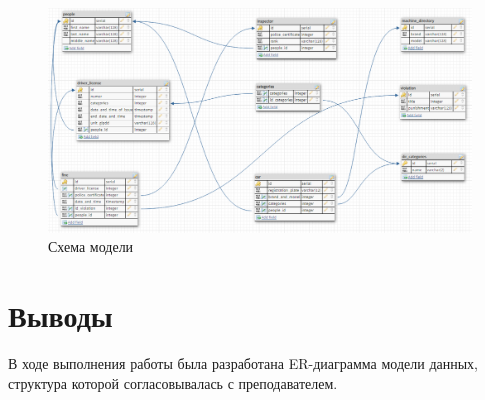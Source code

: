 \begin{figure}[H]
	\begin{center}
		\includegraphics[scale=0.6]{../../diagram/diagram.png}
		\caption{Схема модели} 
		\label{pic:pic_name} %
	\end{center}
\end{figure}

\section{Выводы}

В ходе выполнения работы была разработана ER-диаграмма модели данных, структура которой согласовывалась с преподавателем.


